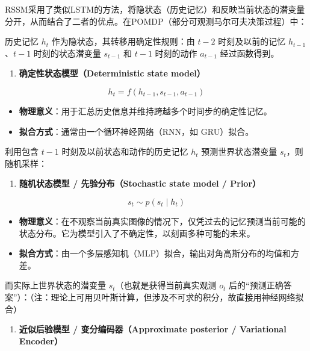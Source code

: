 RSSM采用了类似LSTM的方法，将隐状态（历史记忆）和反映当前状态的潜变量分开，从而结合了二者的优点。在POMDP（部分可观测马尔可夫决策过程）中：

历史记忆 \(h_t\) 作为隐状态，其转移用确定性规则：由 \(t-2\) 时刻及以前的记忆 \(h_{t-1}\)、\(t-1\) 时刻的状态潜变量 \(s_{t-1}\) 和 \(t-1\) 时刻的动作 \(a_{t-1}\) 经过函数得到。

\begin{enumerate}
\def\labelenumi{\arabic{enumi}.}
\tightlist
\item
  \textbf{确定性状态模型（Deterministic state model）}
\end{enumerate}

\[
h_t = f(h_{t-1}, s_{t-1}, a_{t-1})
\]

\begin{itemize}
\tightlist
\item
  \textbf{物理意义}：用于汇总历史信息并维持跨越多个时间步的确定性记忆。
\item
  \textbf{拟合方式}：通常由一个循环神经网络（RNN，如 GRU）拟合。
\end{itemize}

利用包含 \(t-1\) 时刻及以前状态和动作的历史记忆 \(h_t\) 预测世界状态潜变量 \(s_t\)，则随机采样：

\begin{enumerate}
\def\labelenumi{\arabic{enumi}.}
\setcounter{enumi}{1}
\tightlist
\item
  \textbf{随机状态模型 / 先验分布（Stochastic state model / Prior）}
\end{enumerate}

\[
s_t \sim p(s_t \mid h_t)
\]

\begin{itemize}
\tightlist
\item
  \textbf{物理意义}：在不观察当前真实图像的情况下，仅凭过去的记忆预测当前可能的状态分布。它为模型引入了不确定性，以刻画多种可能的未来。
\item
  \textbf{拟合方式}：由一个多层感知机（MLP）拟合，输出对角高斯分布的均值和方差。
\end{itemize}

而实际上世界状态的潜变量 \(s_t\)（也就是获得当前真实观测 \(o_t\) 后的``预测正确答案''）：（注：理论上可用贝叶斯计算，但涉及不可求的积分，故直接用神经网络拟合）

\begin{enumerate}
\def\labelenumi{\arabic{enumi}.}
\setcounter{enumi}{2}
\tightlist
\item
  \textbf{近似后验模型 / 变分编码器（Approximate posterior / Variational Encoder）}
\end{enumerate}

